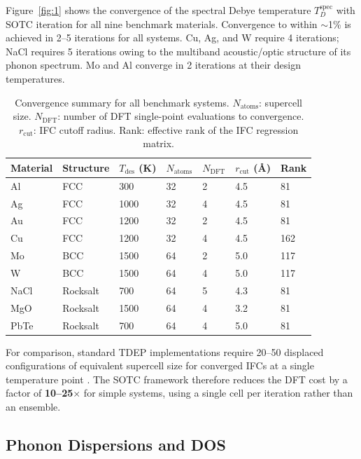 \documentclass[aps,prb,reprint,amsmath,amssymb,floatfix]{revtex4-2}
\begin{document}
Figure~\ref{fig:1} shows the convergence of the spectral Debye temperature
\(T_D^\text{spec}\) with SOTC iteration for all nine benchmark
materials. Convergence to within $\sim$1\% is achieved in 2--5 iterations for all
systems. Cu, Ag, and W require 4 iterations; NaCl requires 5 iterations owing to
the multiband acoustic/optic structure of its phonon spectrum. Mo and Al
converge in 2 iterations at their design temperatures.

\begin{table}[htbp]
\caption{Convergence summary for all benchmark systems.
\(N_\text{atoms}\): supercell size. \(N_\text{DFT}\): number of DFT
single-point evaluations to convergence. \(r_\text{cut}\): IFC cutoff
radius. Rank: effective rank of the IFC regression
matrix.}
\begin{ruledtabular}
\begin{tabular}{lllllll}Material & Structure & \(T_\text{des}\) (K) & \(N_\text{atoms}\) & \(N_\text{DFT}\) & \(r_\text{cut}\) (Å) & Rank \\
\hline
Al & FCC & 300 & 32 & 2 & 4.5 & 81 \\
Ag & FCC & 1000 & 32 & 4 & 4.5 & 81 \\
Au & FCC & 1200 & 32 & 2 & 4.5 & 81 \\
Cu & FCC & 1200 & 32 & 4 & 4.5 & 162 \\
Mo & BCC & 1500 & 64 & 2 & 5.0 & 117 \\
W & BCC & 1500 & 64 & 4 & 5.0 & 117 \\
NaCl & Rocksalt & 700 & 64 & 5 & 4.3 & 81 \\
MgO & Rocksalt & 1500 & 64 & 4 & 3.2 & 81 \\
PbTe & Rocksalt & 700 & 64 & 4 & 5.0 & 81 \\
\end{tabular}
\end{ruledtabular}
\label{tab:1}
\end{table}

For comparison, standard TDEP implementations require 20--50 displaced
configurations of equivalent supercell size for converged IFCs at a
single temperature point \cite{ref5,ref6}. The SOTC framework therefore
reduces the DFT cost by a factor of \textbf{10--25$\times$} for simple systems,
using a single cell per iteration rather than an ensemble.

\subsection{Phonon Dispersions and
DOS}\label{phonon-dispersions-and-dos}
\end{document}
